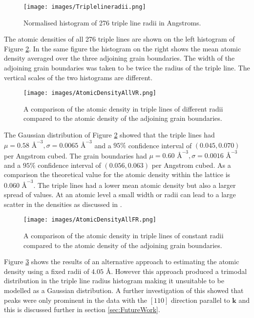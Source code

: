 \documentclass[12pt,a4paper,openany]{report}
\begin{document}
\begin{figure}[H]
	\texttt{[image: images/Triplelineradii.png]}  
	\caption{Normalised histogram of 276 triple line radii in Angstroms.}	
	\label{fig:TJRadii}
\end{figure}	

The atomic densities of all 276 triple lines are shown on the left histogram of Figure \ref{fig:AtomicDensityVR}. In the same figure the histogram on the right shows the mean atomic density averaged over the three adjoining grain boundaries. The width of the adjoining grain boundaries was taken to be twice the radius of the triple line. The vertical scales of the two histograms are different. 

\begin{figure}[H]
	\centering
	\texttt{[image: images/AtomicDensityAllVR.png]} 
	\caption{A comparison of the atomic density in triple lines of different radii compared to the atomic density of the adjoining grain boundaries.}
	\label{fig:AtomicDensityVR}
\end{figure}

The Gaussian distribution of Figure \ref{fig:AtomicDensityVR}  showed that the triple lines had $\mu = 0.58 \textrm{ \AA}^{-3}, \sigma = 0.0065 \textrm{ \AA}^{-3} $ and a $95\%$ confidence interval of $(0.045, 0.070)$ per Angstrom cubed. The grain boundaries had $\mu = 0.60 \textrm{ \AA}^{-3}, \sigma = 0.0016 \textrm{ \AA}^{-3} $ and a $95\%$ confidence interval of $(0.056, 0.063)$ per Angstrom cubed. As a comparison the theoretical value for the atomic density within the lattice is
$0.060 \textrm{ \AA}^{-3}$. The triple lines had a lower mean atomic density but also a larger spread of values. At an atomic level a small width or radii can lead to a large scatter in the densities as discussed in \cite{Kamachali2019}.  

\begin{figure}[H]
	\centering
	\texttt{[image: images/AtomicDensityAllFR.png]} 	
	\caption{A comparison of the atomic density in triple lines of constant radii  compared to the atomic density of the adjoining grain boundaries.}
	\label{fig:AtomicDensityFR}
\end{figure}

Figure \ref{fig:AtomicDensityFR} shows the results of an alternative approach to estimating the atomic density using a fixed radii of $4.05 \textrm{ \AA}$. However this approach produced a trimodal distribution in the triple line radius histogram making it unsuitable to be modelled as a Gaussian distribution. A further investigation of this showed that peaks were only prominent in the data with the $[110]$ direction parallel to $\mathbf{k}$ and this is discussed further in section \ref{sec:FutureWork}. 
\end{document}

